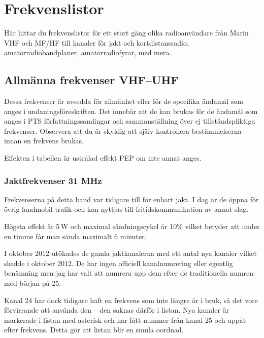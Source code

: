 \chapter{Frekvenslistor}

Här hittar du frekvenslistor för ett stort gäng olika radioanvändare
från Marin VHF och MF/HF till kanaler för jakt och kortdistansradio,
amatörradiobandplaner, amatörradiofyrar, med mera.

\clearpage

\section{Allmänna frekvenser VHF--UHF}

Dessa frekvenser är avsedda för allmänhet eller för de specifika
ända\-mål som anges i undantagsföreskriften. Det innebär att de kan
brukas för de ändamål som anges i PTS för\-fatt\-nings\-sam\-ling\-ar
och sammanställning över ej tillståndspliktiga frekvenser. Observera
att du är skyldig att själv kontrollera bestämmelserna innan en
frekvens brukas.

Effekten i tabellen är ustrålad effekt PEP om inte annat anges.

\subsection{Jaktfrekvenser 31 MHz}

Frekvenserna på detta band var tidigare till för enbart jakt. I dag är
de öppna för övrig landmobil trafik och kan nyttjas till
fritidskommunikation av annat slag.

Högsta effekt är 5\,W och maximal sändningscykel är 10\% vilket
betyder att under en timme får man sända maximalt 6 minuter.

I oktober 2012 utökades de gamla jaktkanalerna med ett antal nya
kanaler vilket skedde i oktober 2012. De har ingen officiell
kanalnumrering eller egentlig benämning men jag har valt att numrera
upp dem efter de traditionella numren med början på 25.

Kanal 24 har dock tidigare haft en frekvens som inte längre är i bruk,
så det vore förvirrande att använda den -- den saknas därför i
listan. Nya kanaler är markerade i listan med asterisk och har fått
nummer från kanal 25 och uppåt efter frekvens. Detta gör att listan
blir en smula oordnad.


